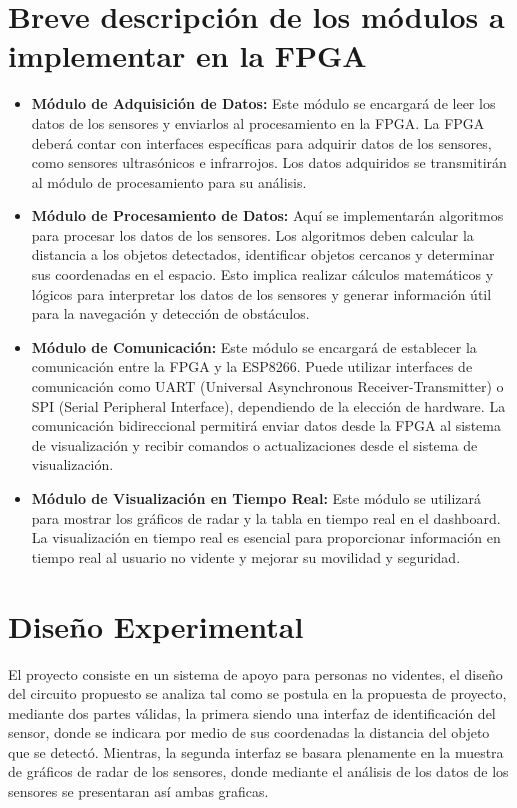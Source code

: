 \documentclass[journal]{IEEEtran}
\begin{document}
\section{Breve descripción de los módulos a implementar en la FPGA}
\begin{itemize}
    \item \textbf{Módulo de Adquisición de Datos:} Este módulo se encargará de leer los datos de los sensores y enviarlos al procesamiento en la FPGA. La FPGA deberá contar con interfaces específicas para adquirir datos de los sensores, como sensores ultrasónicos e infrarrojos. Los datos adquiridos se transmitirán al módulo de procesamiento para su análisis.
    
    \item \textbf{Módulo de Procesamiento de Datos:} Aquí se implementarán algoritmos para procesar los datos de los sensores. Los algoritmos deben calcular la distancia a los objetos detectados, identificar objetos cercanos y determinar sus coordenadas en el espacio. Esto implica realizar cálculos matemáticos y lógicos para interpretar los datos de los sensores y generar información útil para la navegación y detección de obstáculos.
    
    \item \textbf{Módulo de Comunicación:} Este módulo se encargará de establecer la comunicación entre la FPGA y la ESP8266. Puede utilizar interfaces de comunicación como UART (Universal Asynchronous Receiver-Transmitter) o SPI (Serial Peripheral Interface), dependiendo de la elección de hardware. La comunicación bidireccional permitirá enviar datos desde la FPGA al sistema de visualización y recibir comandos o actualizaciones desde el sistema de visualización.
    
    \item \textbf{Módulo de Visualización en Tiempo Real:} Este módulo se utilizará para mostrar los gráficos de radar y la tabla en tiempo real en el dashboard. La visualización en tiempo real es esencial para proporcionar información en tiempo real al usuario no vidente y mejorar su movilidad y seguridad.
\end{itemize}

\section{Diseño Experimental}

El proyecto consiste en un sistema de apoyo para personas no videntes, el diseño del circuito propuesto se analiza tal como se postula en la propuesta de proyecto, mediante dos partes válidas, la primera siendo una interfaz de identificación del sensor, donde se indicara por medio de sus coordenadas la distancia del objeto que se detectó. Mientras, la segunda interfaz se basara plenamente en la muestra de gráficos de radar de los sensores, donde mediante el análisis de los datos de los sensores se presentaran así ambas graficas.\\
\end{document}
